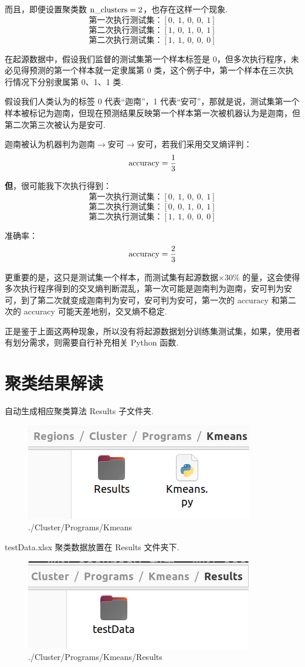 \documentclass[oneside,UTF8]{article}
\numberwithin{figure}{section}
\numberwithin{table}{section}
\numberwithin{equation}{section}
\newcommand*{\red}{\color[rgb]{1 0 0}}
\begin{document}
而且，即便设置聚类数 $\rm n\_clusters=2$，也存在这样一个现象.
\[ \mbox{第一次执行测试集：}[0,\ 1,\ 0,\ 0,\ 1] \]
\[ \mbox{第二次执行测试集：}[1,\ 0,\ 1,\ 0,\ 1] \]
\[ \mbox{第二次执行测试集：}[1,\ 1,\ 0,\ 0,\ 0] \]

在起源数据中，假设我们监督的测试集第一个样本标签是 0，但多次执行程序，未必见得预测的第一个样本就一定隶属第 0 类，这个例子中，第一个样本在三次执行情况下分别隶属第 0、1、1 类.

假设我们人类认为的标签 0 代表“迦南”，1 代表“安可”，那就是说，测试集第一个样本被标记为迦南，但现在预测结果反映第一个样本第一次被机器认为是迦南，但第二次第三次被认为是安可.

迦南被认为机器判为迦南$\to$安可$\to$安可，若我们采用交叉熵评判：
\[ \rm accuracy=\frac{1}{3} \]

{\bf\red 但}，很可能我下次执行得到：
\[ \mbox{第一次执行测试集：}[0,\ 1,\ 0,\ 0,\ 1] \]
\[ \mbox{第二次执行测试集：}[0,\ 0,\ 1,\ 0,\ 1] \]
\[ \mbox{第二次执行测试集：}[1,\ 1,\ 0,\ 0,\ 0] \]

准确率：
\[ \rm accuracy=\frac{2}{3} \]

更重要的是，这只是测试集一个样本，而测试集有起源数据$\times30\%$ 的量，这会使得多次执行程序得到的交叉熵判断混乱，第一次可能是迦南判为迦南，安可判为安可，到了第二次就变成迦南判为安可，安可判为安可，第一次的 accuracy 和第二次的 accuracy 可能天差地别，交叉熵不稳定.

正是鉴于上面这两种现象，所以没有将起源数据划分训练集测试集，如果，使用者有划分需求，则需要自行补充相关 Python 函数.



\section{聚类结果解读}
自动生成相应聚类算法 Results 子文件夹.
\begin{figure}[H]
	\centering
	\includegraphics*[scale=0.3]{./images/KmeansResultsFileFolder.png}
	\caption{./Cluster/Programs/Kmeans}
\end{figure}

testData.xlsx 聚类数据放置在 Results 文件夹下.
\begin{figure}[H]
	\centering
	\includegraphics*[scale=0.3]{./images/testDataFileFloder.png}
	\caption{./Cluster/Programs/Kmeans/Results}
\end{figure}
\end{document}
